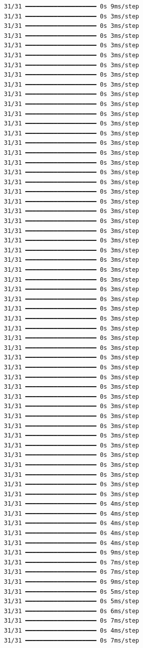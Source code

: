 \documentclass[
  letterpaper,
  DIV=11,
  numbers=noendperiod]{scrreprt}
\begin{document}
\begin{verbatim}
31/31 ━━━━━━━━━━━━━━━━━━━━ 0s 9ms/step
31/31 ━━━━━━━━━━━━━━━━━━━━ 0s 3ms/step
31/31 ━━━━━━━━━━━━━━━━━━━━ 0s 3ms/step
31/31 ━━━━━━━━━━━━━━━━━━━━ 0s 3ms/step
31/31 ━━━━━━━━━━━━━━━━━━━━ 0s 3ms/step
31/31 ━━━━━━━━━━━━━━━━━━━━ 0s 3ms/step
31/31 ━━━━━━━━━━━━━━━━━━━━ 0s 3ms/step
31/31 ━━━━━━━━━━━━━━━━━━━━ 0s 3ms/step
31/31 ━━━━━━━━━━━━━━━━━━━━ 0s 3ms/step
31/31 ━━━━━━━━━━━━━━━━━━━━ 0s 3ms/step
31/31 ━━━━━━━━━━━━━━━━━━━━ 0s 3ms/step
31/31 ━━━━━━━━━━━━━━━━━━━━ 0s 3ms/step
31/31 ━━━━━━━━━━━━━━━━━━━━ 0s 3ms/step
31/31 ━━━━━━━━━━━━━━━━━━━━ 0s 3ms/step
31/31 ━━━━━━━━━━━━━━━━━━━━ 0s 3ms/step
31/31 ━━━━━━━━━━━━━━━━━━━━ 0s 3ms/step
31/31 ━━━━━━━━━━━━━━━━━━━━ 0s 3ms/step
31/31 ━━━━━━━━━━━━━━━━━━━━ 0s 3ms/step
31/31 ━━━━━━━━━━━━━━━━━━━━ 0s 3ms/step
31/31 ━━━━━━━━━━━━━━━━━━━━ 0s 3ms/step
31/31 ━━━━━━━━━━━━━━━━━━━━ 0s 3ms/step
31/31 ━━━━━━━━━━━━━━━━━━━━ 0s 3ms/step
31/31 ━━━━━━━━━━━━━━━━━━━━ 0s 3ms/step
31/31 ━━━━━━━━━━━━━━━━━━━━ 0s 3ms/step
31/31 ━━━━━━━━━━━━━━━━━━━━ 0s 3ms/step
31/31 ━━━━━━━━━━━━━━━━━━━━ 0s 3ms/step
31/31 ━━━━━━━━━━━━━━━━━━━━ 0s 3ms/step
31/31 ━━━━━━━━━━━━━━━━━━━━ 0s 3ms/step
31/31 ━━━━━━━━━━━━━━━━━━━━ 0s 3ms/step
31/31 ━━━━━━━━━━━━━━━━━━━━ 0s 3ms/step
31/31 ━━━━━━━━━━━━━━━━━━━━ 0s 3ms/step
31/31 ━━━━━━━━━━━━━━━━━━━━ 0s 3ms/step
31/31 ━━━━━━━━━━━━━━━━━━━━ 0s 3ms/step
31/31 ━━━━━━━━━━━━━━━━━━━━ 0s 3ms/step
31/31 ━━━━━━━━━━━━━━━━━━━━ 0s 3ms/step
31/31 ━━━━━━━━━━━━━━━━━━━━ 0s 3ms/step
31/31 ━━━━━━━━━━━━━━━━━━━━ 0s 3ms/step
31/31 ━━━━━━━━━━━━━━━━━━━━ 0s 3ms/step
31/31 ━━━━━━━━━━━━━━━━━━━━ 0s 3ms/step
31/31 ━━━━━━━━━━━━━━━━━━━━ 0s 3ms/step
31/31 ━━━━━━━━━━━━━━━━━━━━ 0s 3ms/step
31/31 ━━━━━━━━━━━━━━━━━━━━ 0s 3ms/step
31/31 ━━━━━━━━━━━━━━━━━━━━ 0s 3ms/step
31/31 ━━━━━━━━━━━━━━━━━━━━ 0s 3ms/step
31/31 ━━━━━━━━━━━━━━━━━━━━ 0s 3ms/step
31/31 ━━━━━━━━━━━━━━━━━━━━ 0s 3ms/step
31/31 ━━━━━━━━━━━━━━━━━━━━ 0s 3ms/step
31/31 ━━━━━━━━━━━━━━━━━━━━ 0s 3ms/step
31/31 ━━━━━━━━━━━━━━━━━━━━ 0s 3ms/step
31/31 ━━━━━━━━━━━━━━━━━━━━ 0s 3ms/step
31/31 ━━━━━━━━━━━━━━━━━━━━ 0s 3ms/step
31/31 ━━━━━━━━━━━━━━━━━━━━ 0s 4ms/step
31/31 ━━━━━━━━━━━━━━━━━━━━ 0s 4ms/step
31/31 ━━━━━━━━━━━━━━━━━━━━ 0s 4ms/step
31/31 ━━━━━━━━━━━━━━━━━━━━ 0s 4ms/step
31/31 ━━━━━━━━━━━━━━━━━━━━ 0s 4ms/step
31/31 ━━━━━━━━━━━━━━━━━━━━ 0s 9ms/step
31/31 ━━━━━━━━━━━━━━━━━━━━ 0s 7ms/step
31/31 ━━━━━━━━━━━━━━━━━━━━ 0s 7ms/step
31/31 ━━━━━━━━━━━━━━━━━━━━ 0s 9ms/step
31/31 ━━━━━━━━━━━━━━━━━━━━ 0s 5ms/step
31/31 ━━━━━━━━━━━━━━━━━━━━ 0s 5ms/step
31/31 ━━━━━━━━━━━━━━━━━━━━ 0s 6ms/step
31/31 ━━━━━━━━━━━━━━━━━━━━ 0s 7ms/step
31/31 ━━━━━━━━━━━━━━━━━━━━ 0s 4ms/step
31/31 ━━━━━━━━━━━━━━━━━━━━ 0s 7ms/step

\end{verbatim}
\end{document}
